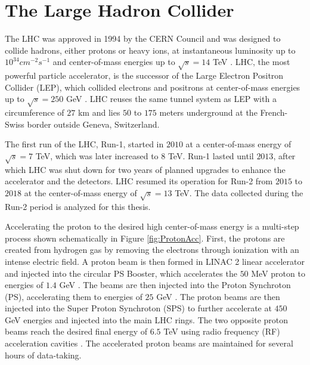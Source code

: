 \section{The Large Hadron Collider}
\label{sec:LHC}

The LHC was approved in 1994 by the CERN Council and was designed to collide hadrons, either protons or heavy ions, at instantaneous luminosity up to $10^{34}cm^{-2}s^{-1}$ and center-of-mass energies up to $\sqrt{s} = 14$ TeV \cite{LHCMachine}. LHC, the most powerful particle accelerator, is the successor of the Large Electron Positron Collider (LEP), which collided electrons and positrons at center-of-mass energies up to $\sqrt{s} = 250$ GeV \cite{LEP}. LHC reuses the same tunnel system as LEP with a circumference of $27$ km and lies $50$ to $175$ meters underground at the French-Swiss border outside Geneva, Switzerland. 

The first run of the LHC, Run-1, started in $2010$ at a center-of-mass energy of $\sqrt{s} = 7$ TeV, which was later increased to $8$ TeV. Run-1 lasted until $2013$, after which LHC was shut down for two years of planned upgrades to enhance the accelerator and the detectors. LHC resumed its operation for Run-2 from $2015$ to $2018$ at the center-of-mass energy of $\sqrt{s} = 13$ TeV. The data collected during the Run-2 period is analyzed for this thesis. 

Accelerating the proton to the desired high center-of-mass energy is a multi-step process shown schematically in Figure \ref{fig:ProtonAcc}. First, the protons are created from hydrogen gas by removing the electrons through ionization with an intense electric field. A proton beam is then formed in LINAC 2 linear accelerator and injected into the circular PS Booster, which accelerates the $50$ MeV proton to energies of $1.4$ GeV \cite{LHCGuide}. The beams are then injected into the Proton Synchroton (PS), accelerating them to energies of $25$ GeV \cite{LHCGuide}. The proton beams are then injected into the Super Proton Synchroton (SPS) to further accelerate at $450$ GeV energies and injected into the main LHC rings. The two opposite proton beams reach the desired final energy of $6.5$ TeV using radio frequency (RF) acceleration cavities \cite{LHCGuide}. The accelerated proton beams are maintained for several hours of data-taking.

